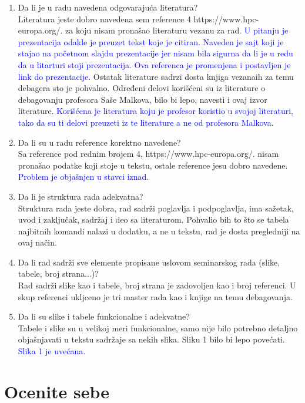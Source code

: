 \documentclass[a4paper]{report}
\newcommand{\odgovor}[1]{\textcolor{blue}{#1}}
\begin{document}
\begin{enumerate}
\item Da li je u radu navedena odgovarajuća literatura?\\
Literatura jeste dobro navedena sem reference 4 https://www.hpc-europa.org/. za koju nisam pronašao literaturu vezanu za rad. 
\odgovor{U pitanju je prezentacija odakle je preuzet tekst koje je citiran. Naveden je sajt koji je stajao na početnom slajdu prezentacije 
jer nisam bila sigurna da li je u redu da u litarturi stoji prezentacija. Ova referenca je promenjena i postavljen je link do prezentacije.}
Ostatak literature sadrzi dosta knjiga vezanaih za temu debagera sto je pohvalno. Određeni delovi korišćeni su iz literature o 
debagovanju profesora Saše Malkova, bilo bi lepo, navesti i ovaj izvor literature.
\odgovor{Korišćena je literatura koju je profesor koristio u svojoj literaturi, tako da su ti delovi preuzeti iz te literature a ne od profesora Malkova.}

\item Da li su u radu reference korektno navedene?\\
Sa reference pod rednim brojem 4, https://www.hpc-europa.org/. nisam pronašao podatke koji stoje u tekstu, ostale reference jesu dobro navedene. \odgovor{Problem je objašnjen u stavci iznad.}

\item Da li je struktura rada adekvatna?\\
Struktura rada jeste dobra, rad sadrži poglavlja i podpoglavlja, ima sažetak, uvod i zaključak, sadržaj i deo sa literaturom. Pohvalio bih to što se tabela najbitnih 
komandi nalazi u dodatku, a ne u tekstu, rad je dosta pregledniji na ovaj način.

\item Da li rad sadrži sve elemente propisane uslovom seminarskog rada (slike, tabele, broj strana...)?\\
Rad sadrži slike kao i tabele, broj strana je zadovoljen kao i broj referenci. U skup referenci ukljceno je tri master rada kao i knjige na temu debagovanja.

\item Da li su slike i tabele funkcionalne i adekvatne?\\
Tabele i slike su u velikoj meri funkcionalne, samo nije bilo potrebno detaljno objašnjavati u tekstu sadržaje sa nekih slika. Sliku 1 bilo bi lepo povećati. \odgovor{Slika 1 je uvećana.}
\end{enumerate}


\section{Ocenite sebe}
\end{document}
